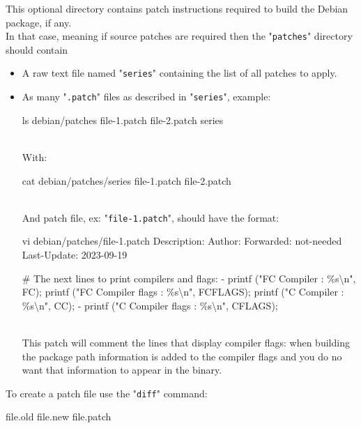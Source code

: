 This optional directory contains patch instructions required to build the Debian package, if any. \\
In that case, meaning if source patches are required then the "\texttt{patches}" directory should contain
\begin{itemize}
\item A raw text file named "\texttt{series}" containing the list of all patches to apply. 
\item As many "\texttt{.patch}" files as described in "\texttt{series}", example:
{\footnotesize{
\begin{scripti}
 ls debian/patches
file-1.patch  file-2.patch  series
\end{scripti}
}}
\\[-0.5cm]
\noindent With: \\[-0.5cm]
{\footnotesize{
\begin{scripti}
 cat debian/patches/series
file-1.patch
file-2.patch
\end{scripti}
}}
\\[-0.5cm]
\noindent And patch file, ex: "\texttt{file-1.patch}", should have the format: \\[-0.5cm] 
{\footnotesize{
\begin{scripti}
 vi debian/patches/file-1.patch
Description:   
Author: 
Forwarded: not-needed
Last-Update: 2023-09-19

   # The next lines to print compilers and flags:
-  printf ("FC    Compiler         : \%s\textbackslash{n}", FC);
   printf ("FC    Compiler flags   : \%s\textbackslash{n}", FCFLAGS);
   printf ("C     Compiler         : \%s\textbackslash{n}", CC);
-  printf ("C     Compiler flags   : \%s\textbackslash{n}", CFLAGS);
\end{scripti}
}}
\\[-0.75cm] This patch will comment the lines that display compiler flags: when building the package path information is added to the compiler flags 
and you do no want that information to appear in the binary. 
\end{itemize}
To create a patch file use the "\texttt{diff}" command:
{\footnotesize{
\begin{scripti}
   file.old file.new \bad{>} file.patch
\end{scripti}
}}

